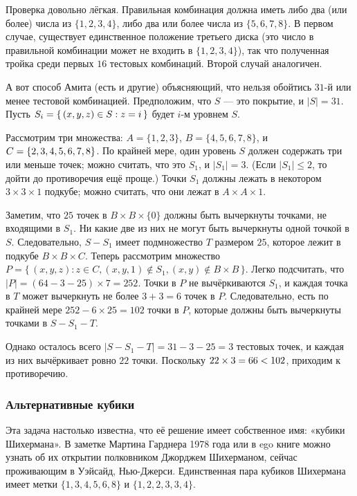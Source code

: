 Проверка довольно лёгкая.
Правильная комбинация должна иметь либо два (или более) числа из $\{1, 2, 3, 4\}$, либо два или более числа из  $\{5, 6, 7, 8\}$.
В первом случае, существует единственное положение третьего диска (это число в правильной комбинации может не входить в $\{1, 2, 3, 4\}$), так что полученная тройка среди первых $16$ тестовых комбинаций.
Второй случай аналогичен.

А вот способ Амита (есть и другие) объясняющий, что нельзя обойтись $31$-й или менее тестовой комбинацией.
Предположим, что $S$ --- это покрытие, и $|S| = 31$.
Пусть $S_i = \{\,(x, y, z) \z\in S : z = i\,\}$ будет $i$-м уровнем $S$.

Рассмотрим три множества:
$A=\{1, 2, 3\}$,
$B = \{4, 5, 6, 7, 8\}$,
и $C \z= \{2, 3, 4, 5, 6, 7, 8\}$.
По крайней мере, один уровень $S$ должен содержать три или меньше точек;
можно считать, что это $S_1$, и $|S_1| = 3$.
(Если $|S_1| \le 2$, то дойти до противоречия ещё проще.)
Точки $S_1$ должны лежать в некотором $3 \times 3 \times 1$ подкубе;
можно считать, что они лежат в $A \times A \times {1}$.

Заметим, что $25$ точек в $B \times B \times \{0\}$ должны быть вычеркнуты точками, не входящими в $S_1$.
Ни какие две из них не могут быть вычеркнуты одной точкой в $S$.
Следовательно, $S - S_1$ имеет подмножество $T$ размером $25$, которое лежит в подкубе $B \times B \times C$.
Теперь рассмотрим множество $P = \{\,(x, y, z) : z \in C, (x, y, 1) \notin S_1 , (x, y) \notin B \times B\,\}$.
Легко подсчитать, что $|P| = (64-3-25) \times 7 = 252$.
Точки в $P$ не вычёркиваются $S_1$, и каждая точка в $T$ может вычеркнуть не более $3 + 3 = 6$ точек в $P$. Следовательно, есть по крайней мере $252 - 6 \times 25 = 102$ точки в $P$, которые должны быть вычеркнуты точками в $S - S_1 - T$.

Однако осталось всего $|S - S_1 - T | = 31 - 3 - 25 = 3$ тестовых точек, и каждая из них вычёркивает ровно $22$ точки.
Поскольку $22 \times 3 = 66 \z< 102$, приходим к противоречию. 

\subsubsection*{Альтернативные кубики}

Эта задача настолько известна, что её решение имеет собственное имя: «кубики Шихермана».
В заметке Мартина Гарднера 1978 года \cite{gardner1978} или в ego книге \cite{gardner1989} можно узнать об их открытии полковником Джорджем Шихерманом, сейчас проживающим в Уэйсайд, Нью-Джерси.
Единственная пара кубиков Шихермана имеет метки $\{1, 3, 4, 5, 6, 8\}$ и $\{1, 2, 2, 3, 3, 4\}$.

